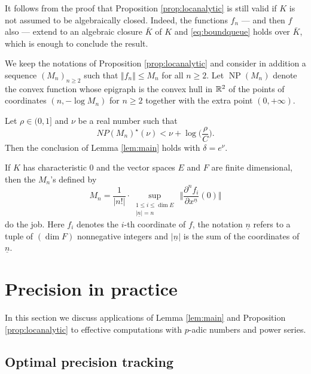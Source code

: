 \documentclass{lms}
\DeclareMathOperator{\NP}{NP}
\begin{document}
\begin{rem}
It follows from the proof that Proposition \ref{prop:locanalytic} is 
still valid if $K$ is not assumed to be algebraically closed. Indeed, 
the functions $f_n$ --- and then $f$ also --- extend to an algebraic
closure $\bar K$ of $K$ and \eqref{eq:boundqueue} holds over $\bar 
K$, which is enough to conclude the result.
\end{rem}

\begin{cor}
We keep the notations of Proposition \ref{prop:locanalytic} and consider 
in addition a sequence $(M_n)_{n \geq 2}$ such that $\Vert f_n \Vert 
\leq M_n$ for all $n \geq 2$. Let $\NP(M_n)$ denote the convex function
whose epigraph is the convex hull in $\mathbb R^2$ of the points of coordinates
$(n, -\log M_n)$ for $n \geq 2$ together with the extra point $(0,
+\infty)$.

Let $\rho \in (0, 1]$ and $\nu$ be a real number such that 
$$NP(M_n)^\star (\nu) < \nu + \log \Big( \frac \rho C \Big).$$
Then the conclusion of Lemma \ref{lem:main} holds with $\delta = e^\nu$.
\end{cor}

\begin{rem}
If $K$ has characteristic $0$ and the vector spaces $E$ and $F$ are
finite dimensional, then the $M_n$'s defined by
$$M_n = \frac 1 {|n!|} \cdot 
\sup_{\substack{1 \leq i \leq \dim E \\ \vert \underline n
\vert = n}} \,
\Big\Vert \frac{\partial^n f_i}{\partial x^{\underline n}}(0) 
\Big\Vert$$
do the job. Here $f_i$ denotes the $i$-th coordinate of $f$, the
notation $\underline n$ refers to a tuple of $(\dim F)$ nonnegative
integers and $\vert \underline n \vert$ is the sum of the coordinates
of $\underline n$.
\end{rem}

\section{Precision in practice}
\label{sec:tracking}

In this section we discuss applications of Lemma \ref{lem:main} and Proposition \ref{prop:locanalytic}
to effective computations with $p$-adic numbers and power series.

\subsection{Optimal precision tracking}
\label{ssec:opt-tracking}
\end{document}
